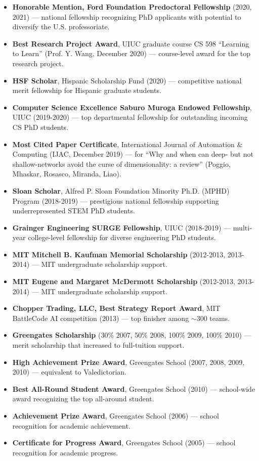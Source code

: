 \documentclass{article}
\newenvironment{changemargin}[2]{%
  \begin{list}{}{%
    \setlength{\topsep}{0pt}%
    \setlength{\leftmargin}{#1}%
    \setlength{\rightmargin}{#2}%
    \setlength{\listparindent}{\parindent}%
    \setlength{\itemindent}{\parindent}%
    \setlength{\parsep}{\parskip}%
  }%
  \item[]}{\end{list}
}
\newenvironment{body} {
		\vspace*{-16pt}
		\begin{changemargin}{-0.25in}{-0.5in}
	  }
		{\end{changemargin}\vspace{8pt plus 12pt}
	}
\begin{document}
\begin{body}
\begin{itemize}
    \item \textbf{Honorable Mention, Ford Foundation Predoctoral Fellowship} (2020, 2021) --- national fellowship recognizing PhD applicants with potential to diversify the U.S. professoriate.
    \item \textbf{Best Research Project Award}, UIUC graduate course CS 598 ``Learning to Learn'' (Prof. Y. Wang, December 2020) --- course-level award for the top research project.
    \item \textbf{HSF Scholar}, Hispanic Scholarship Fund (2020) --- competitive national merit fellowship for Hispanic graduate students.
    \item \textbf{Computer Science Excellence Saburo Muroga Endowed Fellowship}, UIUC (2019-2020) --- top departmental fellowship for outstanding incoming CS PhD students.
    \item \textbf{Most Cited Paper Certificate}, International Journal of Automation \& Computing (IJAC, December 2019) --- for ``Why and when can deep- but not shallow-networks avoid the curse of dimensionality: a review'' (Poggio, Mhaskar, Rosasco, Miranda, Liao).
    \item \textbf{Sloan Scholar}, Alfred P. Sloan Foundation Minority Ph.D. (MPHD) Program (2018-2019) --- prestigious national fellowship supporting underrepresented STEM PhD students.
    \item \textbf{Grainger Engineering SURGE Fellowship}, UIUC (2018-2019) --- multi-year college-level fellowship for diverse engineering PhD students.
		\item \textbf{MIT Mitchell B. Kaufman Memorial Scholarship} (2012-2013, 2013-2014) --- MIT undergraduate scholarship support.
		\item \textbf{MIT Eugene and Margaret McDermott Scholarship} (2012-2013, 2013-2014) --- MIT undergraduate scholarship support.
	\item \textbf{Chopper Trading, LLC, Best Strategy Report Award}, MIT BattleCode AI competition (2013) --- top finisher among $\sim$300 teams.
	 	\item \textbf{Greengates Scholarship} (30\% 2007, 50\% 2008, 100\% 2009, 100\% 2010) --- merit scholarship that increased to full-tuition support.
	\item \textbf{High Achievement Prize Award}, Greengates School (2007, 2008, 2009, 2010) --- equivalent to Valedictorian.
		\item \textbf{Best All-Round Student Award}, Greengates School (2010) --- school-wide award recognizing the top all-around student.
		\item \textbf{Achievement Prize Award}, Greengates School (2006) --- school recognition for academic achievement.
		\item \textbf{Certificate for Progress Award}, Greengates School (2005) --- school recognition for academic progress.
\end{itemize}
\end{body}
\end{document}
